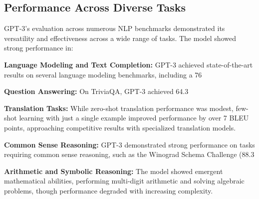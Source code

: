 \subsection{Performance Across Diverse Tasks}

GPT-3's evaluation across numerous NLP benchmarks demonstrated its versatility and effectiveness across a wide range of tasks. The model showed strong performance in:

\textbf{Language Modeling and Text Completion:} GPT-3 achieved state-of-the-art results on several language modeling benchmarks, including a 76%

\textbf{Question Answering:} On TriviaQA, GPT-3 achieved 64.3%


\textbf{Translation Tasks:} While zero-shot translation performance was modest, few-shot learning with just a single example improved performance by over 7 BLEU points, approaching competitive results with specialized translation models.

\textbf{Common Sense Reasoning:} GPT-3 demonstrated strong performance on tasks requiring common sense reasoning, such as the Winograd Schema Challenge (88.3%


\textbf{Arithmetic and Symbolic Reasoning:} The model showed emergent mathematical abilities, performing multi-digit arithmetic and solving algebraic problems, though performance degraded with increasing complexity.


